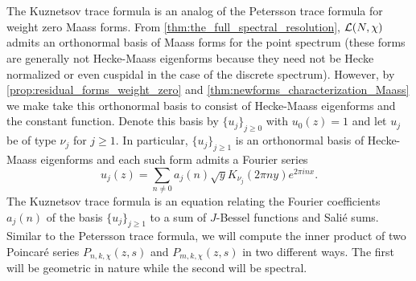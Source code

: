   \section{}
    The Kuznetsov trace formula is an analog of the Petersson trace formula for weight zero Maass forms. From \cref{thm:the_full_spectral_resolution}, $\mathcal{L}(N,\chi)$ admits an orthonormal basis of Maass forms for the point spectrum (these forms are generally not Hecke-Maass eigenforms because they need not be Hecke normalized or even cuspidal in the case of the discrete spectrum). However, by \cref{prop:residual_forms_weight_zero} and \cref{thm:newforms_characterization_Maass} we make take this orthonormal basis to consist of Hecke-Maass eigenforms and the constant function. Denote this basis by $\{u_{j}\}_{j \ge 0}$ with $u_{0}(z) = 1$ and let $u_{j}$ be of type $\nu_{j}$ for $j \ge 1$. In particular, $\{u_{j}\}_{j \ge 1}$ is an orthonormal basis of Hecke-Maass eigenforms and each such form admits a Fourier series
    \[
      u_{j}(z) = \sum_{n \neq 0}a_{j}(n)\sqrt{y}K_{\nu_{j}}(2\pi ny)e^{2\pi inx}.
    \]
    The Kuznetsov trace formula is an equation relating the Fourier coefficients $a_{j}(n)$ of the basis $\{u_{j}\}_{j \ge 1}$ to a sum of $J$-Bessel functions and Sali\'e sums. Similar to the Petersson trace formula, we will compute the inner product of two Poincar\'e series $P_{n,k,\chi}(z,s)$ and $P_{m,k,\chi}(z,s)$ in two different ways. The first will be geometric in nature while the second will be spectral. 
    
